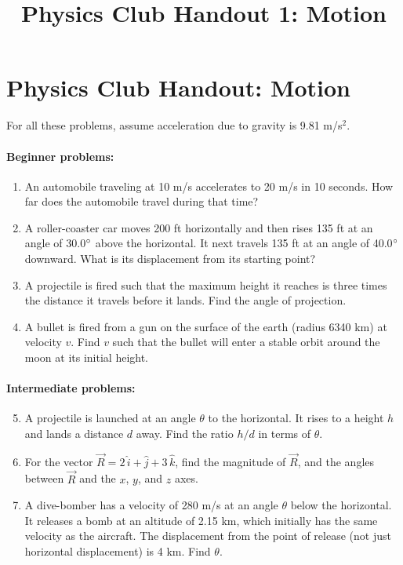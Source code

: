 \documentclass[12pt,letterpaper]{article}
\title{Physics Club Handout 1: Motion}
\begin{document}
\section{Physics Club Handout: Motion}
For all these problems, assume acceleration due to gravity is 9.81 m\slash s$^2$.

\paragraph{Beginner problems:}
\begin{enumerate}
\item
An automobile traveling at 10 m\slash s accelerates to 20 m\slash s in 10 seconds. How far does the automobile travel during that time?

\item
A roller-coaster car moves 200 ft horizontally and then rises 135 ft at an angle of 30.0$\degree$ above the horizontal. It next travels 135 ft at an angle of 40.0$\degree$ downward. What is its displacement from its starting point?

\item
A projectile is fired such that the maximum height it reaches is three times the distance it travels before it lands. Find the angle of projection.

\item
A bullet is fired from a gun on the surface of the earth (radius 6340 km) at velocity $v$. Find $v$ such that the bullet will enter a stable orbit around the moon at its initial height.
\end{enumerate}
\paragraph{Intermediate problems:}
\begin{enumerate}
\setcounter{enumi}{4}
\item
A projectile is launched at an angle $\theta$ to the horizontal. It rises to a height $h$ and lands a distance $d$ away. Find the ratio $h/d$ in terms of $\theta$.

\item
For the vector $\vec{R} = 2\,\hat{i} + \hat{j} + 3\,\hat{k}$, find the magnitude of $\vec{R}$, and the angles between $\vec{R}$ and the $x$, $y$, and $z$ axes.

\item
A dive-bomber has a velocity of 280 m\slash s at an angle $\theta$ below the horizontal. It releases a bomb at an altitude of 2.15 km, which initially has the same velocity as the aircraft. The displacement from the point of release (not just horizontal displacement) is 4 km. Find $\theta$.
\end{enumerate}
\end{document}
